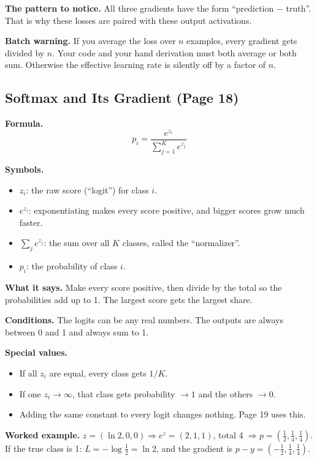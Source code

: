 \textbf{The pattern to notice.} All three gradients have the form ``prediction $-$ truth''. That is why these losses are paired with these output activations.

\textbf{Batch warning.} If you average the loss over $n$ examples, every gradient gets divided by $n$. Your code and your hand derivation must both average or both sum. Otherwise the effective learning rate is silently off by a factor of $n$.

\subsection*{Softmax and Its Gradient (Page 18)}

\textbf{Formula.}
\[
p_i = \frac{e^{z_i}}{\sum_{j=1}^{K} e^{z_j}}
\]

\textbf{Symbols.}
\begin{itemize}
  \item $z_i$: the raw score (``logit'') for class $i$.
  \item $e^{z_i}$: exponentiating makes every score positive, and bigger scores grow much faster.
  \item $\sum_j e^{z_j}$: the sum over all $K$ classes, called the ``normalizer''.
  \item $p_i$: the probability of class $i$.
\end{itemize}

\textbf{What it says.} Make every score positive, then divide by the total so the probabilities add up to 1. The largest score gets the largest share.

\textbf{Conditions.} The logits can be any real numbers. The outputs are always between 0 and 1 and always sum to 1.

\textbf{Special values.}
\begin{itemize}
  \item If all $z_i$ are equal, every class gets $1/K$.
  \item If one $z_i \to \infty$, that class gets probability $\to 1$ and the others $\to 0$.
  \item Adding the same constant to every logit changes nothing. Page 19 uses this.
\end{itemize}

\textbf{Worked example.} $z = (\ln 2, 0, 0) \Rightarrow e^z = (2,1,1)$, total 4 $\Rightarrow p = (\tfrac12, \tfrac14, \tfrac14)$. If the true class is 1: $L = -\log\tfrac12 = \ln 2$, and the gradient is $p - y = (-\tfrac12, \tfrac14, \tfrac14)$.

